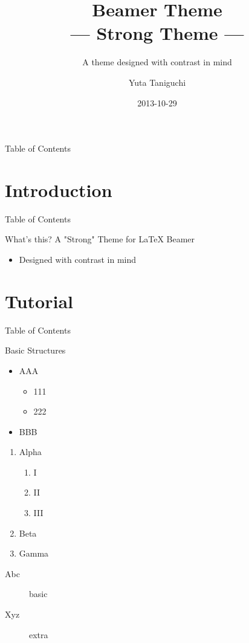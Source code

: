 \documentclass[12pt,t,hyperref={pdfencoding=auto}]{beamer}
\title[Strong Theme]{Beamer Theme\\--- Strong Theme ---}
\subtitle{A theme designed with contrast in mind}
\author[Y.~Taniguchi]{Yuta Taniguchi}
\institute{@yuttieyuttie}
\date{2013-10-29}
\begin{document}
{
  \frame{\titlepage}
}
\setcounter{framenumber}{0}


\begin{frame}{Table of Contents}
  \toc
\end{frame}


\section{Introduction}
\begin{frame}{Table of Contents}
  \toc[currentsection]
\end{frame}


\begin{frame}{What's this?}
  A "Strong" Theme for LaTeX Beamer
  \begin{itemize}
  \item Designed with contrast in mind
  \end{itemize}
\end{frame}


\section{Tutorial}
\begin{frame}{Table of Contents}
  \toc[currentsection]
\end{frame}


\begin{frame}{Basic Structures}
  \begin{itemize}
  \item AAA
    \begin{itemize}
    \item 111
    \item 222
    \end{itemize}
  \item BBB
  \end{itemize}
  \begin{enumerate}
  \item Alpha
    \begin{enumerate}
    \item I
    \item II
    \item III
    \end{enumerate}
  \item Beta
  \item Gamma
  \end{enumerate}
  \begin{description}
  \item[Abc] basic
  \item[Xyz] extra
  \end{description}
\end{frame}
\end{document}
